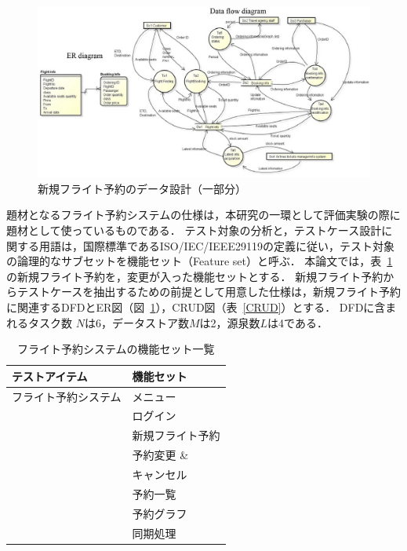 \documentclass[a4paper,11pt]{jreport}
\begin{document}
\begin{figure}[tb]　%
\begin{center}
\includegraphics[scale=0.68]{dfdanderd.eps}
\end{center}
\caption{新規フライト予約のデータ設計（一部分）}
\label{fig:DFD}
\end{figure}

題材となるフライト予約システムの仕様は，本研究の一環として評価実験の際に題材として使っているものである\cite{Yumo2014}．
テスト対象の分析と，テストケース設計に関する用語は，国際標準であるISO/IEC/IEEE29119の定義に従い，テスト対象の論理的なサブセットを機能セット（Feature set）と呼ぶ\cite{29119}．%
本論文では，表~\ref{Featurelist}の新規フライト予約を，変更が入った機能セットとする．
新規フライト予約からテストケースを抽出するための前提として用意した仕様は，新規フライト予約に関連するDFDとER図（図~\ref{fig:DFD}），CRUD図（表~\ref{CRUD}）とする．
DFDに含まれるタスク数 $N$は6，データストア数$M$は2，源泉数$L$は4である．

\begin{table}[t]
\caption{フライト予約システムの機能セット一覧}
\label{Featurelist}
\begin{center}
\begin{tabular}{l|l}
\hline
テストアイテム&機能セット
\\
\hline\hline
フライト予約システム&メニュー\\
\cline{2-2}
&ログイン\\
\cline{2-2}
&新規フライト予約\\
\cline{2-2}
&予約変更 \&\\
&キャンセル\\
\cline{2-2}
&予約一覧\\
\cline{2-2}
&予約グラフ\\
\cline{2-2}
&同期処理\\
\hline
\end{tabular}
\end{center}
\end{table}
\end{document}
